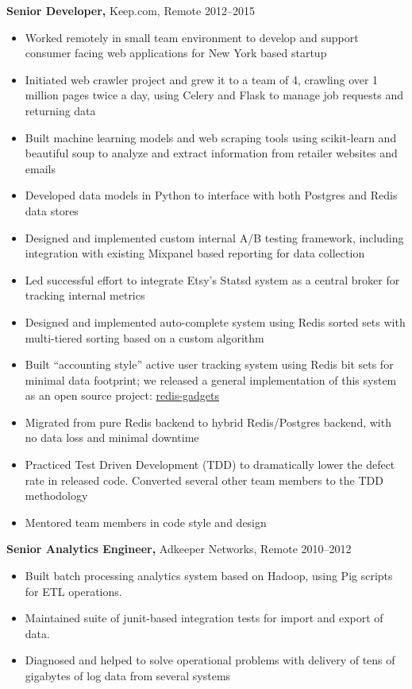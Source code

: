 \documentclass[margin]{res}
\begin{document}
\begin{resume}
 {\bf Senior Developer,} Keep.com, Remote \hfill 2012--2015
\begin{itemize}
  \item Worked remotely in small team environment to develop and support
      consumer facing web applications for New York based startup
  \item Initiated web crawler project and grew it to a team of 4, crawling
    over 1 million pages twice a day, using Celery and Flask to manage job
    requests and returning data
  \item Built machine learning models and web scraping tools using
    scikit-learn and beautiful soup to analyze and extract information from
    retailer websites and emails
  \item Developed data models in Python to interface with both Postgres and
    Redis data stores
  \item Designed and implemented custom internal A/B testing framework,
    including integration with existing Mixpanel based reporting for data
    collection
  \item Led successful effort to integrate Etsy's Statsd system as a central
    broker for tracking internal metrics
  \item Designed and implemented auto-complete system using Redis sorted sets
    with multi-tiered sorting based on a custom algorithm
  \item Built ``accounting style'' active user tracking system using Redis bit
    sets for minimal data footprint; we released a general implementation of
    this system as an open source project:
    \href{https://github.com/saltmine/redis-gadgets}{redis-gadgets}
  \item Migrated from pure Redis backend to hybrid Redis/Postgres backend,
      with no data loss and minimal downtime
  \item Practiced Test Driven Development (TDD) to dramatically lower the
      defect rate in released code.  Converted several other team members to
      the TDD methodology
  \item Mentored team members in code style and design
\end{itemize}

{\bf Senior Analytics Engineer,} Adkeeper Networks, Remote \hfill  2010--2012
\begin{itemize}
  \item Built batch processing analytics system based on Hadoop, using Pig
      scripts for ETL operations.
  \item Maintained suite of junit-based integration tests for import and
      export of data.
  \item Diagnosed and helped to solve operational problems with delivery of
      tens of gigabytes of log data from several systems
\end{itemize}


\end{resume}
\end{document}
